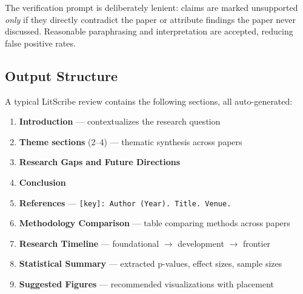 \documentclass[11pt]{article}
\begin{document}
\begin{figure}[ht]
\centering
{}
\label{alg:grounding}
\end{figure}

The verification prompt is deliberately lenient: claims are marked unsupported \textit{only} if they directly contradict the paper or attribute findings the paper never discussed. Reasonable paraphrasing and interpretation are accepted, reducing false positive rates.

\subsection{Output Structure}

A typical LitScribe review contains the following sections, all auto-generated:

\begin{enumerate}[nosep]
    \item \textbf{Introduction} --- contextualizes the research question
    \item \textbf{Theme sections} (2--4) --- thematic synthesis across papers
    \item \textbf{Research Gaps and Future Directions}
    \item \textbf{Conclusion}
    \item \textbf{References} --- \texttt{[key]: Author (Year). Title. Venue.}
    \item \textbf{Methodology Comparison} --- table comparing methods across papers
    \item \textbf{Research Timeline} --- foundational $\rightarrow$ development $\rightarrow$ frontier
    \item \textbf{Statistical Summary} --- extracted p-values, effect sizes, sample sizes
    \item \textbf{Suggested Figures} --- recommended visualizations with placement
\end{enumerate}
\end{document}
